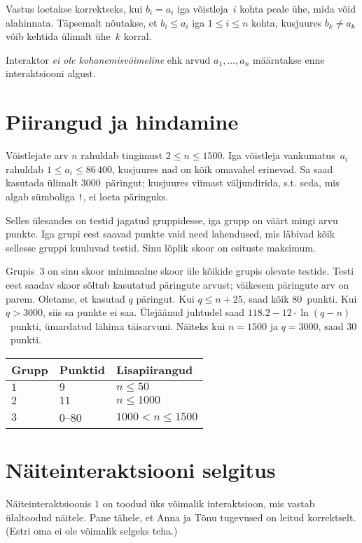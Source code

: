 Vastus loetakse korrektseks, kui $b_i=a_i$ iga võistleja~$i$ kohta peale ühe, mida võid alahinnata.
Täpsemalt nõutakse, et $b_i\leq a_i$ iga $1\leq i\leq n$ kohta, kusjuures $b_k \neq a_k$ võib kehtida ülimalt ühe~$k$ korral.

Interaktor \emph{ei ole kohanemisvõimeline} ehk arvud $a_1, \ldots, a_n$ määratakse enne interaktsiooni algust.

\section*{Piirangud ja hindamine}

Võistlejate arv $n$ rahuldab tingimust
$2\leq n\leq 1500$. %
Iga võistleja vankumatus~$a_i$ rahuldab
$1\leq a_i\leq 86\,400$, %
kusjuures nad on kõik omavahel erinevad. %
Sa saad kasutada
ülimalt $3000$~päringut; %
kusjuures viimast väljundirida, s.t. seda, mis algab sümboliga \texttt{!}, ei loeta päringuks.

Selles ülesandes on testid jagatud gruppidesse, iga grupp on väärt mingi arvu punkte.
Iga grupi eest saavad punkte vaid need lahendused, mis läbivad kõik sellesse gruppi kuuluvad testid.
Sinu lõplik skoor on esituste maksimum.

Grupis~$3$ on sinu skoor minimaalne skoor üle kõikide grupis olevate testide.
Testi eest saadav skoor sõltub kasutatud päringute arvust;
väikesem päringute arv on parem.
Oletame, et kasutad $q$ päringut.
Kui $q \le n+25$, saad kõik $80$~punkti.
Kui $q > 3000$, siis sa punkte ei saa.
Ülejäänud juhtudel saad
$118.2 - 12 \cdot \ln(q - n)$~punkti, ümardatud lähima täisarvuni. %
Näiteks kui $n = 1500$ ja $q = 3000$, saad $30$~punkti.

\medskip
\begin{tabular}{lll}
Grupp & Punktid & Lisapiirangud \\\hline
$1$  &  $9$ & $n\leq 50$\\
$2$  &  $11$ & $n\leq 1000$\\
$3$  &  $0$--$80$ & $1000 < n\leq 1500$\\
\end{tabular}

\section*{Näiteinteraktsiooni selgitus}

Näiteinteraktsioonis $1$ on toodud üks võimalik interaktsioon, mis vastab
ülaltoodud näitele.
Pane tähele, et Anna ja Tõnu tugevused on leitud korrektselt.
(Estri oma ei ole võimalik selgeks teha.)

